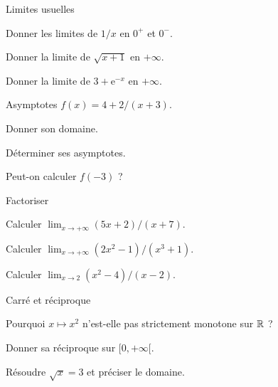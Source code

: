 \exercices
{}
\begingroup\renewcommand{\otBesoinPlace}[1]{}\begin{minipage}{\linewidth}
\begin{exercice}[1]{Limites usuelles}

\begin{questions}
\item Donner les limites de $1/x$ en $0^+$ et $0^-$.
\item Donner la limite de $\sqrt{x+1}$ en $+\infty$.
\item Donner la limite de $3+\mathrm e^{-x}$ en $+\infty$.
\end{questions}
\end{exercice}
\begin{exercice}[1]{Asymptotes}
$f(x)=4+2/(x+3)$.
\begin{questions}
\item Donner son domaine.
\item Déterminer ses asymptotes.
\item Peut-on calculer $f(-3)$ ?
\end{questions}
\end{exercice}
\begin{exercice}[1]{Factoriser}

\begin{questions}
\item Calculer $\lim_{x\to+\infty}(5x+2)/(x+7)$.
\item Calculer $\lim_{x\to+\infty}(2x^2-1)/(x^3+1)$.
\item Calculer $\lim_{x\to2}(x^2-4)/(x-2)$.
\end{questions}
\end{exercice}
\begin{exercice}[1]{Carré et réciproque}

\begin{questions}
\item Pourquoi $x\mapsto x^2$ n’est-elle pas strictement monotone sur $\mathbb{R}$ ?
\item Donner sa réciproque sur $[0,+\infty[$.
\item Résoudre $\sqrt x=3$ et préciser le domaine.
\end{questions}
\end{exercice}
\end{minipage}\endgroup
\clearpage
{}
